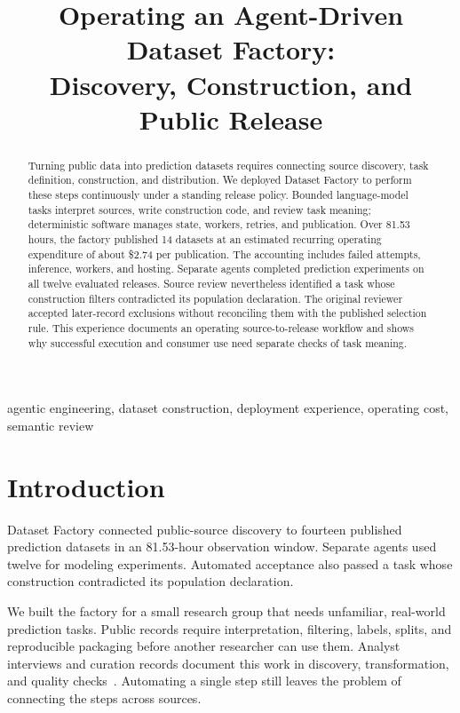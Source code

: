\documentclass[conference,10pt,letterpaper]{IEEEtran}
\title{Operating an Agent-Driven Dataset Factory:\\Discovery, Construction, and Public Release}
\author{\IEEEauthorblockN{Eduardo Ari\~no de la Rubia}\IEEEauthorblockA{Central European University\\\texttt{rubiae@ceu.edu}}\and\IEEEauthorblockN{Szilard Pafka}\IEEEauthorblockA{Epoch\\\texttt{szilard@epoch.com}}}
\begin{document}
\maketitle

\begin{abstract}
Turning public data into prediction datasets requires connecting source discovery, task definition, construction, and distribution. We deployed Dataset Factory to perform these steps continuously under a standing release policy. Bounded language-model tasks interpret sources, write construction code, and review task meaning; deterministic software manages state, workers, retries, and publication. Over 81.53 hours, the factory published 14 datasets at an estimated recurring operating expenditure of about \$2.74 per publication. The accounting includes failed attempts, inference, workers, and hosting. Separate agents completed prediction experiments on all twelve evaluated releases. Source review nevertheless identified a task whose construction filters contradicted its population declaration. The original reviewer accepted later-record exclusions without reconciling them with the published selection rule. This experience documents an operating source-to-release workflow and shows why successful execution and consumer use need separate checks of task meaning.
\end{abstract}
\begin{IEEEkeywords}agentic engineering, dataset construction, deployment experience, operating cost, semantic review\end{IEEEkeywords}

\section{Introduction}
Dataset Factory connected public-source discovery to fourteen published prediction datasets in an 81.53-hour observation window. Separate agents used twelve for modeling experiments. Automated acceptance also passed a task whose construction contradicted its population declaration.

We built the factory for a small research group that needs unfamiliar, real-world prediction tasks. Public records require interpretation, filtering, labels, splits, and reproducible packaging before another researcher can use them. Analyst interviews and curation records document this work in discovery, transformation, and quality checks~\cite{kandel,lafia}. Automating a single step still leaves the problem of connecting the steps across sources.
\end{document}
